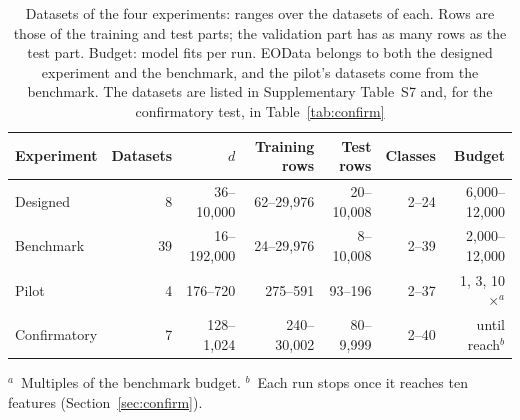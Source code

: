 \begin{table}[!tbp]
\caption{Datasets of the four experiments: ranges over the datasets of each. Rows are those of the training and test parts; the validation part has as many rows as the test part. Budget: model fits per run. EOData belongs to both the designed experiment and the benchmark, and the pilot's datasets come from the benchmark. The datasets are listed in Supplementary Table~S7 and, for the confirmatory test, in Table~\ref{tab:confirm}}
\label{tab:datasets}
\centering
\small
\setlength{\tabcolsep}{4pt}
\begin{tabular}{@{}lrrrrrr@{}}
\toprule
Experiment & Datasets & $d$ & Training rows & Test rows & Classes & Budget \\
\midrule
Designed & 8 & 36--10{,}000 & 62--29{,}976 & 20--10{,}008 & 2--24 & 6{,}000--12{,}000 \\
Benchmark & 39 & 16--192{,}000 & 24--29{,}976 & 8--10{,}008 & 2--39 & 2{,}000--12{,}000 \\
Pilot & 4 & 176--720 & 275--591 & 93--196 & 2--37 & 1, 3, 10$\times$$^{a}$ \\
Confirmatory & 7 & 128--1{,}024 & 240--30{,}002 & 80--9{,}999 & 2--40 & until reach$^{b}$ \\
\bottomrule
\end{tabular}

\smallskip
\raggedright
\footnotesize
$^{a}$~Multiples of the benchmark budget. $^{b}$~Each run stops once it reaches ten features (Section~\ref{sec:confirm}).
\end{table}
